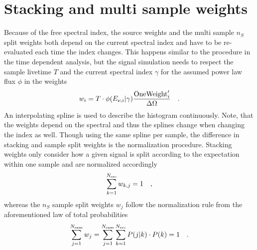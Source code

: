 \section{Stacking and multi sample weights}
Because of the free spectral index, the source weights and the multi sample $n_S$ split weights both depend on the current spectral index and have to be re-evaluated each time the index changes.
This happens similar to the procedure in the time dependent analysis, but the signal simulation needs to respect the sample livetime $T$ and the current spectral index $\gamma$ for the assumed power law flux $\phi$ in the weights
\begin{equation}
  w_i = T\cdot \phi(E_{\nu,i}|\gamma)\frac{\text{OneWeight}'_i}{\Delta\Omega}
  \quad\text{.}
\end{equation}
An interpolating spline is used to describe the histogram continuously.
Note, that the weights depend on the spectral and thus the splines change when changing the index as well.
Though using the same spline per sample, the difference in stacking and sample split weights is the normalization procedure.
Stacking weights only consider how a given signal is split according to the expectation within one sample and are normalized accordingly
\begin{equation}
  \sum_{k=1}^{N_\text{src}} w_{k,j} = 1
  \quad\text{,}
\end{equation}
whereas the $n_S$ sample split weights $w_j$ follow the normalization rule from the aforementioned law of total probabilities
\begin{equation}
  \sum_{j=1}^{N_\text{sam}} w_j
  = \sum_{j=1}^{N_\text{sam}} \sum_{k=1}^{N_\text{src}} P(j|k)\cdot P(k) = 1
  \quad\text{.}
\end{equation}

